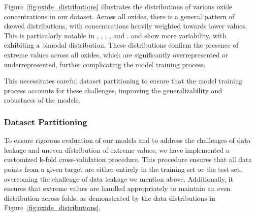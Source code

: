Figure~\ref{fig:oxide_distributions} illustrates the distributions of various oxide concentrations in our dataset.
Across all oxides, there is a general pattern of skewed distributions, with concentrations heavily weighted towards lower values.
This is particularly notable in , , , , and .
 and  show more variability, with  exhibiting a bimodal distribution.
These distributions confirm the presence of extreme values across all oxides, which are significantly overrepresented or underrepresented, further complicating the model training process.

This necessitates careful dataset partitioning to ensure that the model training process accounts for these challenges, improving the generalizability and robustness of the models.

\subsubsection{Dataset Partitioning}\label{subsubsec:dataset_partitioning}
To ensure rigorous evaluation of our models and to address the challenges of data leakage and uneven distribution of extreme values, we have implemented a customized k-fold cross-validation procedure.
This procedure ensures that all data points from a given target are either entirely in the training set or the test set, overcoming the challenge of data leakage we mention above.
Additionally, it ensures that extreme values are handled appropriately to maintain an even distribution across folds, as demonstrated by the data distributions in Figure~\ref{fig:oxide_distributions}.

